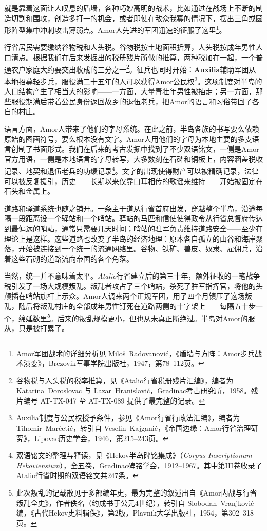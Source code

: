 就是靠着这面让人叹息的盾墙，各种巧妙高明的战术，比如通过在战场上不断的制造切割和围攻，创造多打一的机会，或者即使在敌众我寡的情况下，摆出三角或圆形阵型集中冲刺攻击薄弱点。Amor人先进的军团迅速的征服了这里\footnote{Amor军团战术的详细分析见 Miloš~Radovanović，《盾墙与方阵：Amor步兵战术演变》，Brezovik军事学院出版社，1947，第78--112页。}。

行省居民需要缴纳谷物税和人头税。谷物税按土地面积折算，人头税按成年男性人口清点。根据我们在后来发掘出的税册残片所做的推算，两种税加在一起，一个普通农户家庭大约要交出收成的三分之一\footnote{谷物税与人头税的税率推算，见《Atalio行省税册残片汇编》，编者为 Katarina~Doroslovac 与 Lazar~Hranislavić，Gradinac考古研究所，1958。残片编号 AT-TX-047 至 AT-TX-089 提供了最完整的记录。}。征兵也同时开始：\textbf{Auxilia}辅助军团从本地招募轻步兵，服役满二十五年的人可以获得Amor公民权\footnote{Auxilia制度与公民权授予条件，参见《Amor行省行政法汇编》，编者为 Tihomir~Marčetić，转引自 Veselin~Kajganić，《帝国边缘：Amor行省治理研究》，Lipovac历史学会，1946，第215--243页。}。这项制度对半岛的人口结构产生了相当大的影响——一方面，大量青壮年男性被抽走；另一方面，那些服役期满后带着公民身份返回故乡的退伍老兵，把Amor的语言和习俗带回了各自的村庄。

语言方面，Amor人带来了他们的字母系统。在此之前，半岛各族的书写要么依赖原始的图画符号，要么根本没有文字。Amor人用他们的字母为本地主要的多支语言创制了书面形式。我们在后来的考古发掘中找到了不少双语铭文，一侧是Amor官方用语，一侧是本地语言的字母转写，大多数刻在石碑和铜板上，内容涵盖税收记录、地契和退伍老兵的功绩记录\footnote{双语铭文的整理与释读，见《Hekov半岛碑铭集成》（\textit{Corpus Inscriptionum Hekoviensium}），全五卷，Gradinac碑铭学会，1912--1967。其中第III卷收录了Atalio行省时期的双语铭文共247条。}。文字的出现使得财产可以被精确记录，法律可以被反复援引，历史——长期以来仅靠口耳相传的歌谣来维持——开始被固定在石头和金属上。

道路和驿道系统也随之铺开。一条主干道从行省首府出发，穿越整个半岛，沿途每隔一段距离设一个驿站和一个哨站。驿站的马匹和信使使得政令从行省总督府传达到最偏远的哨站，通常只需要几天时间；哨站的驻军负责维持道路安全——至少在理论上是这样。这些道路也改变了半岛的经济地理：原本各自孤立的山谷和海岸聚落，开始被连接到一个统一的流通网络里。谷物、铁矿、兽皮、奴隶、雇佣兵，沿着这些石砌的道路流向帝国的各个角落。

当然，统一并不意味着太平。\textit{Atalio}行省建立后的第三十年，额外征收的一笔战争税引发了一场大规模叛乱。叛乱者攻占了三个哨站，杀死了驻军指挥官，将他的头颅插在哨站旗杆上示众。Amor人调来两个正规军团，用了四个月镇压了这场叛乱，随后将叛乱村庄的全部成年男性钉死在道路两侧的十字架上——每隔五十步一个，绵延数里\footnote{此次叛乱的记载散见于多部编年史，最为完整的叙述出自《Amor内战与行省叛乱全史》，作者佚名（约成书于公元4世纪），转引自 Slobodan~Vranjković 编，《古代Hekov史料辑佚》，第2版，Plavnik大学出版社，1954，第302--318页。}。后来的叛乱规模更小，但也从未真正断绝过。半岛对Amor的服从，只是被打累了。

